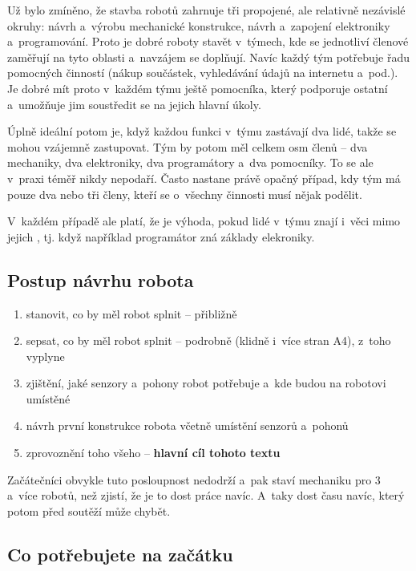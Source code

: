 Už bylo zmíněno, že stavba robotů zahrnuje tři propojené, 
ale relativně nezávislé okruhy: návrh a~výrobu mechanické konstrukce, 
návrh a~zapojení elektroniky a~programování.
Proto je dobré roboty stavět v~týmech, kde se jednotliví členové zaměřují na tyto oblasti a~navzájem se doplňují.
Navíc každý tým potřebuje řadu pomocných činností (nákup součástek, vyhledávání údajů na internetu a~pod.).
Je dobré mít proto v~každém týmu ještě pomocníka, který podporuje ostatní a~umožňuje jim soustředit se na jejich hlavní úkoly.

Úplně ideální potom je, když každou funkci v~týmu zastávají dva lidé, takže se mohou vzájemně zastupovat.
Tým by potom měl celkem osm členů -- dva mechaniky, dva elektroniky, dva programátory a~dva pomocníky.
To se ale v~praxi téměř nikdy nepodaří.
Často nastane právě opačný případ, kdy tým má pouze dva nebo tři členy, kteří se o~všechny činnosti musí nějak podělit.

V~každém případě ale platí, že je výhoda, pokud lidé v~týmu znají i~věci mimo jejich , tj. když například programátor zná základy elekroniky.

\subsection{Postup návrhu robota}

\begin{enumerate} %
\item  stanovit, co by měl robot splnit -- přibližně 
\item  sepsat, co by měl robot splnit -- podrobně (klidně i~více stran A4), z~toho vyplyne
\item  zjištění, jaké senzory a~pohony robot potřebuje a~kde budou na robotovi umístěné
\item  návrh první konstrukce robota včetně umístění senzorů a~pohonů
\item  zprovoznění toho všeho -- {\bf hlavní cíl tohoto textu }
\end{enumerate}

Začátečníci obvykle tuto posloupnost nedodrží a~pak staví mechaniku pro 3 a~více robotů, než zjistí, že je to dost práce navíc.
A~taky dost času navíc, který potom před soutěží může chybět. 



\subsection{Co potřebujete na začátku}

